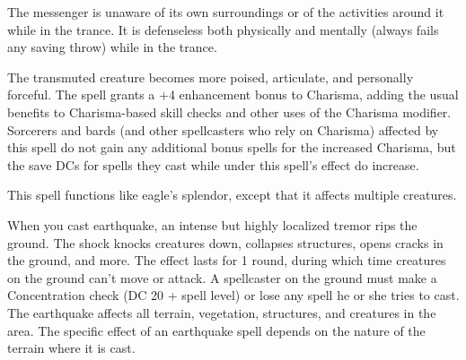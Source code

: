 \begin{multicols}{2}
\begin{small}
\smallskip\noindent The messenger is unaware of its own surroundings or of the activities around it while in the trance. It is defenseless both physically and mentally (always fails any saving throw) while in the trance.

\noindent The transmuted creature becomes more poised, articulate, and personally forceful. The spell grants a +4 enhancement bonus to Charisma, adding the usual benefits to Charisma-based skill checks and other uses of the Charisma modifier. Sorcerers and bards (and other spellcasters who rely on Charisma) affected by this spell do not gain any additional bonus spells for the increased Charisma, but the save DCs for spells they cast while under this spell's effect do increase.


\noindent This spell functions like eagle's splendor, except that it affects multiple creatures.

\noindent When you cast earthquake, an intense but highly localized tremor rips the ground. The shock knocks creatures down, collapses structures, opens cracks in the ground, and more. The effect lasts for 1 round, during which time creatures on the ground can't move or attack. A spellcaster on the ground must make a Concentration check (DC 20 + spell level) or lose any spell he or she tries to cast. The earthquake affects all terrain, vegetation, structures, and creatures in the area. The specific effect of an earthquake spell depends on the nature of the terrain where it is cast.


\end{small}
\end{multicols}
